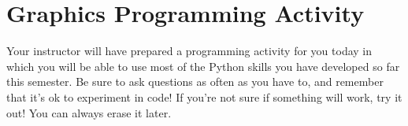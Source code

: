 
\chapter{Graphics Programming Activity}
\label{day:graphics-programming}


\minitoc

Your instructor will have prepared a programming activity for you today in which you will be able to use most of the Python skills you have developed so far this semester.  Be sure to ask questions as often as you have to, and remember that it's ok to experiment in code!  If you're not sure if something will work, try it out!  You can always erase it later.